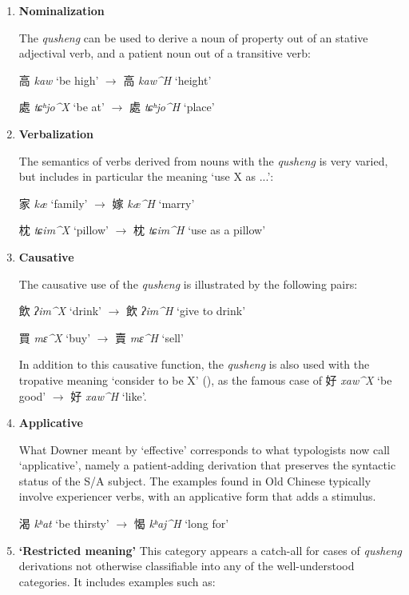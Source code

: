 \documentclass[oneside,a4paper,11pt]{article}
\newcommand{\ipa}[1]{{\phon\textit{\mbox{#1}}}}
\newcommand{\zh}[1]{{\cn#1}}
\newcommand{\ch}[3]{\zh{#1} \ipa{#2} `#3'}
\begin{document}
\begin{enumerate}
\item \textbf{Nominalization}

The \textit{qusheng} can be used to derive a noun of property out of an stative adjectival verb, and a patient noun out of a transitive verb:

\ch{高}{kaw}{be high} $\rightarrow$ \ch{高}{kaw^H}{height} 

\ch{處}{tɕʰjo^X}{be at} $\rightarrow$ \ch{處}{tɕʰjo^H}{place} 

\item \textbf{Verbalization} 

The semantics of verbs derived from nouns with the \textit{qusheng} is very varied, but includes in particular the meaning `use X as ...':

\ch{家}{kæ}{family} $\rightarrow$ \ch{嫁}{kæ^H}{marry} 

\ch{枕}{tɕim^X}{pillow} $\rightarrow$ \ch{枕}{tɕim^H}{use as a pillow} 

\item \textbf{Causative}

The causative use of the \textit{qusheng} is illustrated by the following pairs:

\ch{飲}{ʔim^X}{drink} $\rightarrow$ \ch{飲}{ʔim^H}{give to drink} 

\ch{買}{mɛ^X}{buy} $\rightarrow$ \ch{賣}{mɛ^H}{sell} 

In addition to this causative function, the \textit{qusheng} is also used with the tropative meaning `consider to be X' (\citealt{jacques13tropative}), as the famous case of \ch{好}{xaw^X}{be good} $\rightarrow$ \ch{好}{xaw^H}{like}.

\item \textbf{Applicative} 

What Downer meant by `effective' corresponds to what typologists now call `applicative', namely a patient-adding derivation that preserves the syntactic status of the S/A subject. The examples found in Old Chinese typically involve experiencer verbs, with an applicative form  that adds a stimulus.

\ch{渴}{kʰat}{be thirsty} $\rightarrow$ \ch{愒}{kʰaj^H}{long for} 

\item \textbf{`Restricted meaning'}
This category appears a catch-all for cases of \textit{qusheng} derivations not otherwise classifiable into any of the well-understood categories. It includes examples such as:


\end{enumerate}
\end{document}
